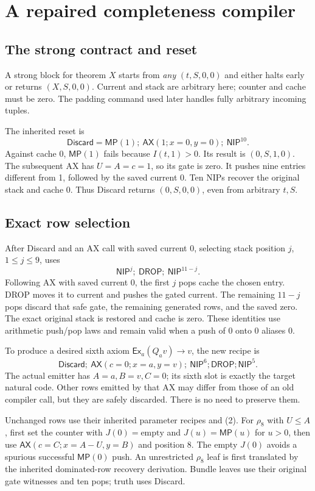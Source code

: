 \documentclass[11pt,a4paper]{article}
\theoremstyle{remark}\newtheorem{remark}[theorem]{Remark}
\newcommand{\AX}{\mathsf{AX}}
\newcommand{\MP}{\mathsf{MP}}
\newcommand{\DROP}{\mathsf{DROP}}
\newcommand{\NIP}{\mathsf{NIP}}
\newcommand{\Discard}{\mathsf{Discard}}
\newcommand{\Ex}[2]{\mathsf{Ex}_{#1}(#2)}
\newcommand{\imp}{\mathbin{\to}}
\begin{document}
\section{A repaired completeness compiler}\label{sec:compiler}

\subsection{The strong contract and reset}

A strong block for theorem $X$ starts from \emph{any}
$(t,S,0,0)$ and either halts early or returns $(X,S,0,0)$.
Current and stack are arbitrary here; counter and cache must be zero.
The padding command used later handles fully arbitrary incoming tuples.

The inherited reset is
\[
 \Discard=\MP(1);\ \AX(1;x=0,y=0);\ \NIP^{10}.
\]
Against cache 0, $\MP(1)$ fails because $I(t,1)>0$.
Its result is $(0,S,1,0)$. The subsequent AX has
$U=A=c=1$, so its gate is zero. It pushes nine entries different
from 1, followed by the saved current 0. Ten NIPs recover the
original stack and cache 0. Thus Discard returns $(0,S,0,0)$,
even from arbitrary $t,S$.

\subsection{Exact row selection}

After Discard and an AX call with saved current 0, selecting stack
position $j$, $1\le j\le9$, uses
\[
 \NIP^j;\ \DROP;\ \NIP^{11-j}.                    \tag{2}
\]
Following AX with saved current 0, the first $j$ pops cache the
chosen entry. DROP moves it to current and pushes the gated current.
The remaining $11-j$ pops discard that safe gate, the remaining
generated rows, and the saved zero. The exact original stack is
restored and cache is zero. These identities use arithmetic
push/pop laws and remain valid when a push of 0 onto 0 aliases 0.

To produce a desired sixth axiom
$\Ex{a}{Q_a v}\imp v$, the new recipe is
\[
 \Discard;\
 \AX(c=0;x=a,y=v);\
 \NIP^6;\DROP;\NIP^5.                            \tag{3}
\]
The actual emitter has $A=a,B=v,C=0$; its sixth slot is exactly
the target natural code. Other rows emitted by that AX may differ
from those of an old compiler call, but they are safely discarded.
There is no need to preserve them.

Unchanged rows use their inherited parameter recipes and (2).
For $\rho_8$ with $U\le A$, first set the counter with
$J(0)=\text{empty}$ and $J(u)=\MP(u)$ for $u>0$,
then use $\AX(c=C;x=A-U,y=B)$ and position 8.
The empty $J(0)$ avoids a spurious successful $\MP(0)$ push.
An unrestricted $\rho_8$ leaf is first translated by the inherited
dominated-row recovery derivation.
Bundle leaves use their original gate witnesses and ten pops;
truth uses Discard.
\end{document}
